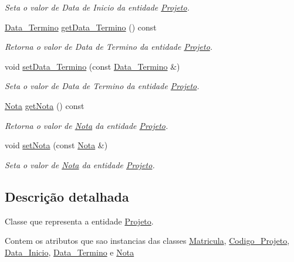 \begin{DoxyCompactItemize}
\begin{DoxyCompactList}\small\item\em \-Seta o valor de \-Data de \-Inicio da entidade \hyperlink{class_projeto}{\-Projeto}. \end{DoxyCompactList}\item 
\hyperlink{class_data___termino}{\-Data\-\_\-\-Termino} \hyperlink{class_projeto_ae29e37b6730fc277a460d864238df94b}{get\-Data\-\_\-\-Termino} () const 
\begin{DoxyCompactList}\small\item\em \-Retorna o valor de \-Data de \-Termino da entidade \hyperlink{class_projeto}{\-Projeto}. \end{DoxyCompactList}\item 
void \hyperlink{class_projeto_a5371af0d47b30cb46fcd02a4d5fde73f}{set\-Data\-\_\-\-Termino} (const \hyperlink{class_data___termino}{\-Data\-\_\-\-Termino} \&)
\begin{DoxyCompactList}\small\item\em \-Seta o valor de \-Data de \-Termino da entidade \hyperlink{class_projeto}{\-Projeto}. \end{DoxyCompactList}\item 
\hyperlink{class_nota}{\-Nota} \hyperlink{class_projeto_add8f77d42d9c5656456b7625f00c2c02}{get\-Nota} () const 
\begin{DoxyCompactList}\small\item\em \-Retorna o valor de \hyperlink{class_nota}{\-Nota} da entidade \hyperlink{class_projeto}{\-Projeto}. \end{DoxyCompactList}\item 
void \hyperlink{class_projeto_ad074101c3df39dea6c3569c75593f338}{set\-Nota} (const \hyperlink{class_nota}{\-Nota} \&)
\begin{DoxyCompactList}\small\item\em \-Seta o valor de \hyperlink{class_nota}{\-Nota} da entidade \hyperlink{class_projeto}{\-Projeto}. \end{DoxyCompactList}\end{DoxyCompactItemize}


\subsection{\-Descrição detalhada}
\-Classe que representa a entidade \hyperlink{class_projeto}{\-Projeto}. 

\-Contem os atributos que sao instancias das classes \hyperlink{class_matricula}{\-Matricula}, \hyperlink{class_codigo___projeto}{\-Codigo\-\_\-\-Projeto}, \hyperlink{class_data___inicio}{\-Data\-\_\-\-Inicio}, \hyperlink{class_data___termino}{\-Data\-\_\-\-Termino} e \hyperlink{class_nota}{\-Nota} 

